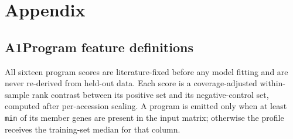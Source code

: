 %
%

\appendix
\section*{Appendix}

\subsection*{A1\quad Program feature definitions}
\label{app:programs}

All sixteen program scores are literature-fixed before any model fitting and are
never re-derived from held-out data. Each score is a coverage-adjusted
within-sample rank contrast between its positive set and its negative-control
set, computed after per-accession scaling. A program is emitted only when at
least \texttt{min} of its member genes are present in the input matrix;
otherwise the profile receives the training-set median for that column.

